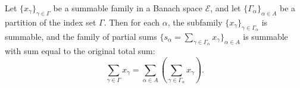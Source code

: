 Let $\{x_\gamma\}_{\gamma \in \Gamma}$ be a summable family in a Banach space $\mathcal{E}$, and let $\{\Gamma_\alpha\}_{\alpha \in A}$ be a partition of the index set $\Gamma$. Then for each $\alpha$, the subfamily $\{x_\gamma\}_{\gamma \in \Gamma_\alpha}$ is summable, and the family of partial sums $\{s_\alpha = \sum_{\gamma \in \Gamma_\alpha} x_\gamma\}_{\alpha \in A}$ is summable with sum equal to the original total sum:
$$\sum_{\gamma \in \Gamma} x_\gamma = \sum_{\alpha \in A} \left( \sum_{\gamma \in \Gamma_\alpha} x_\gamma \right).$$
